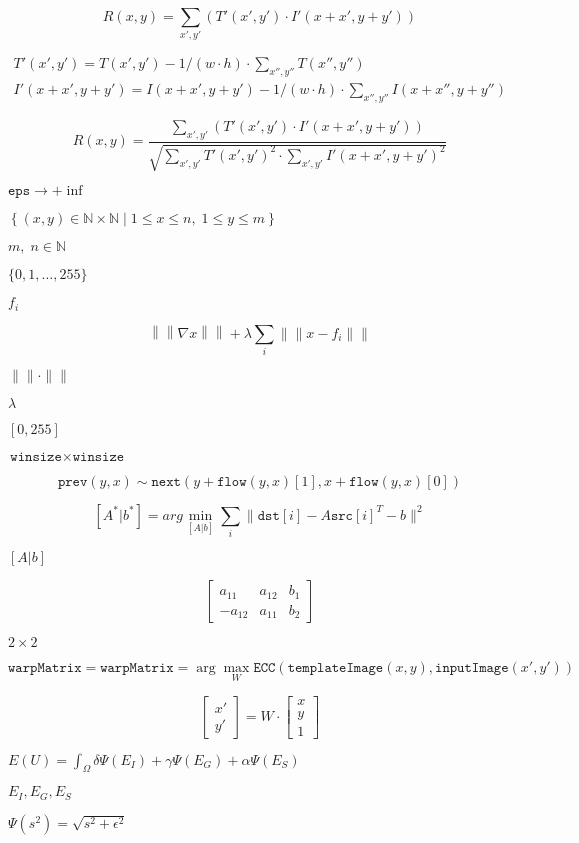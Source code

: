 \documentclass{article}
\begin{document}
\[R(x,y)= \sum _{x',y'} (T'(x',y') \cdot I'(x+x',y+y'))\]
\pagebreak

\[\begin{array}{l} T'(x',y')=T(x',y') - 1/(w \cdot h) \cdot \sum _{x'',y''} T(x'',y'') \\ I'(x+x',y+y')=I(x+x',y+y') - 1/(w \cdot h) \cdot \sum _{x'',y''} I(x+x'',y+y'') \end{array}\]
\pagebreak

\[R(x,y)= \frac{ \sum_{x',y'} (T'(x',y') \cdot I'(x+x',y+y')) }{ \sqrt{\sum_{x',y'}T'(x',y')^2 \cdot \sum_{x',y'} I'(x+x',y+y')^2} }\]
\pagebreak

$\texttt{eps}\rightarrow +\inf$
\pagebreak

$\left\{(x,y)\in\mathbb{N}\times\mathbb{N}\mid 1\leq x\leq n,\;1\leq y\leq m\right\}$
\pagebreak

$m,\;n\in\mathbb{N}$
\pagebreak

$\{0,1,\dots,255\}$
\pagebreak

$f_i$
\pagebreak

\[\left\|\left\|\nabla x\right\|\right\| + \lambda\sum_i\left\|\left\|x-f_i\right\|\right\|\]
\pagebreak

$\|\|\cdot\|\|$
\pagebreak

$\lambda$
\pagebreak

$[0,255]$
\pagebreak

$\texttt{winsize}\times\texttt{winsize}$
\pagebreak

\[\texttt{prev} (y,x) \sim \texttt{next} ( y + \texttt{flow} (y,x)[1], x + \texttt{flow} (y,x)[0])\]
\pagebreak

\[[A^*|b^*] = arg \min _{[A|b]} \sum _i \| \texttt{dst}[i] - A { \texttt{src}[i]}^T - b \| ^2\]
\pagebreak

$[A|b]$
\pagebreak

\[\begin{bmatrix} a_{11} & a_{12} & b_1 \\ -a_{12} & a_{11} & b_2 \end{bmatrix}\]
\pagebreak

$2\times 2$
\pagebreak

\[\texttt{warpMatrix} = \texttt{warpMatrix} = \arg\max_{W} \texttt{ECC}(\texttt{templateImage}(x,y),\texttt{inputImage}(x',y'))\]
\pagebreak

\[\begin{bmatrix} x' \\ y' \end{bmatrix} = W \cdot \begin{bmatrix} x \\ y \\ 1 \end{bmatrix}\]
\pagebreak

$E(U) = \int_{\Omega} \delta \Psi(E_I) + \gamma \Psi(E_G) + \alpha \Psi(E_S) $
\pagebreak

$E_I,E_G,E_S$
\pagebreak

$\Psi(s^2)=\sqrt{s^2+\epsilon^2}$
\pagebreak
\end{document}
